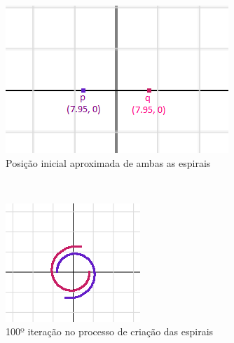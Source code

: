 \begin{enumerate}
  \begin{figure}[!htp]
    \centering
    \begin{subfigure}[t]{0.3\textwidth}
        \centerline{\includegraphics[width=.9\textwidth]{img/cap1_ex6}}
        \caption{Posição inicial aproximada de ambas as espirais}
        \label{fig:cap01_ex6a}
    \end{subfigure}
    ~
    \begin{subfigure}[t]{0.3\textwidth}
        \centerline{\includegraphics[width=.9\textwidth]{img/cap1_ex6b}}
        \caption{100º iteração no processo de criação das espirais}
        \label{fig:cap01_ex6b}
    \end{subfigure}
    ~
    \begin{subfigure}[t]{0.3\textwidth}

\end{subfigure}
\end{figure}
\end{enumerate}
